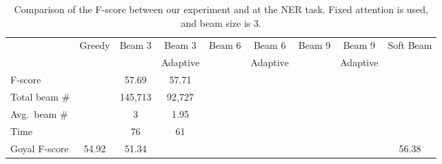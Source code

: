 \documentclass[11pt,a4paper]{article}
\begin{document}
\begin{table*}[ht]
\centering
\caption{Comparison of the F-score between our experiment and \cite{goyal2017continuous} at the NER task. Fixed attention is used, and beam size is 3.}
\label{tab:comp}
\begin{tabular}{lcccccccc}
\toprule
& Greedy & Beam 3 & Beam 3 & Beam 6 & Beam 6 & Beam 9 & Beam 9 & Soft Beam \\
& & & Adaptive & & Adaptive & & Adaptive & \\
\midrule
F-score & & 57.69 & 57.71 & & & & & \\
Total beam \# & & 145,713 & 92,727 & & & & & \\
Avg.~beam \# & & 3 & 1.95 & & & & & \\
Time & & 76 & 61 & & & & & \\
Goyal F-score & 54.92 & 51.34 & & & & & & 56.38 \\ \bottomrule
\end{tabular}
\end{table*}







%
%


\end{document}
